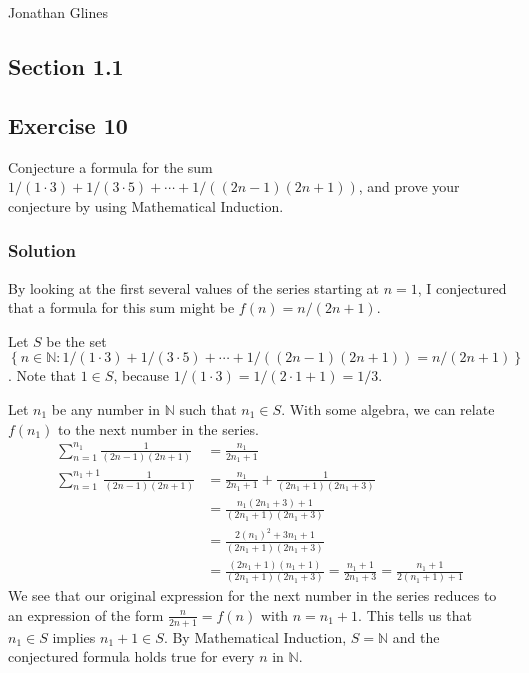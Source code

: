\documentclass[12pt]{article}
\begin{document}
\begin{flushright}
\Large{Jonathan Glines}
\end{flushright}
\begin{flushleft}
\section*{Section 1.1}
\subsection*{Exercise 10}
Conjecture a formula for the sum $1 / \left(1 \cdot 3\right) + 1 / \left(3 \cdot 5\right) + \cdots + 1 / \left(\left(2n - 1 \right)\left(2n + 1\right)\right)$, and prove your conjecture by using Mathematical Induction.
\subsubsection*{Solution}
By looking at the first several values of the series starting at $n = 1$, I conjectured that a formula for this sum might be $f\left(n\right) = n / \left(2n + 1\right)$.

Let $S$ be the set $\left\{n \in \mathbb{N} : 1 / \left(1 \cdot 3\right) + 1 / \left(3 \cdot 5\right) + \cdots + 1 / \left(\left(2n - 1 \right)\left(2n + 1\right)\right) = n / \left(2n + 1\right) \right\}$. Note that $1 \in S$, because $1 / \left(1 \cdot 3\right) = 1 / \left(2\cdot 1 + 1\right) = 1/3$.

Let $n_1$ be any number in $\mathbb{N}$ such that $n_1 \in S$. With some algebra, we can relate $f\left(n_1\right)$ to the next number in the series.
\begin{align*}
\sum_{n=1}^{n_1}\frac{1}{\left(2n - 1 \right)\left(2n + 1\right)} &= \frac{n_1}{2n_1 + 1} \\
\sum_{n=1}^{n_1 + 1}\frac{1}{\left(2n - 1 \right)\left(2n + 1\right)} &= \frac{n_1}{2n_1 + 1} + \frac{1}{\left(2n_1 + 1\right)\left(2n_1 + 3\right)} \\
&= \frac{n_1\left(2n_1 + 3\right) + 1}{\left(2n_1 + 1\right)\left(2n_1 + 3\right)} \\
&= \frac{2\left(n_1\right)^2 + 3n_1 + 1}{\left(2n_1 + 1\right)\left(2n_1 + 3\right)} \\
&= \frac{\left(2n_1 + 1\right)\left(n_1 + 1\right)}{\left(2n_1 + 1\right)\left(2n_1 + 3\right)} = \frac{n_1 + 1}{2n_1 + 3} = \frac{n_1 + 1}{2\left(n_1 + 1\right) + 1}
\end{align*}
We see that our original expression for the next number in the series reduces to an expression of the form $\frac{n}{2n + 1} = f\left(n\right)$ with $n = n_1 + 1$. This tells us that $n_1 \in S$ implies $n_1 + 1 \in S$. By Mathematical Induction, $S = \mathbb{N}$ and the conjectured formula holds true for every $n$ in $\mathbb{N}$.
\end{flushleft}
\end{document}
